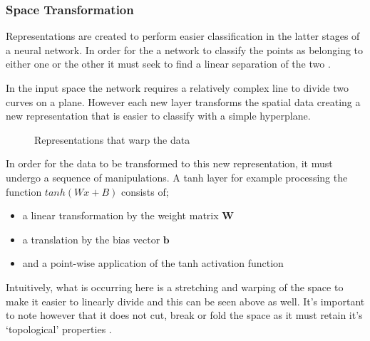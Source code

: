\documentclass[a4paper,11pt,titlepage]{article}
\begin{document}
		\subsubsection{Space Transformation}
	 	Representations are created to perform easier classification in the latter stages of a neural network. In order for the a network to classify the points as belonging to either one or the other it must seek to find a linear separation of the two \cite{Olah2014a}. 
		\par 
		In the input space the network requires a relatively complex line to divide two curves on a plane. However each new layer transforms the spatial data creating a new representation that is easier to classify with a simple hyperplane.
				
		\begin{figure}[H]
    			\centering	
    			\qquad
    			\caption{Representations that warp the data}%
		\end{figure}		
		
		\par 
		In order for the data to be transformed to this new representation, it must undergo a sequence of manipulations. A tanh layer for example processing the function $ tanh(Wx + B) $ consists of; 
		\begin{itemize}
			\item a linear transformation by the weight matrix $ \bm{W} $
			\item a translation by the bias vector $ \bm{b} $
			\item and a point-wise application of the tanh activation function
		\end{itemize}
		Intuitively, what is occurring here is a stretching and warping of the space to make it easier to linearly divide and this can be seen above as well. It's important to note however that it does not cut, break or fold the space as it must retain it's `topological' properties \cite{Choi2005}.
		\par 
								
\end{document}
